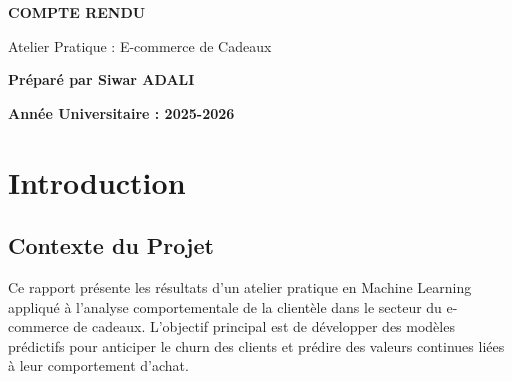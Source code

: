 \documentclass[11pt,a4paper]{article}
\begin{document}
\begin{titlepage}

\vspace{6cm}

\begin{center}
{\LARGE\textbf{COMPTE RENDU}}\par
\vspace{1cm}
{\large Atelier Pratique : E-commerce de Cadeaux}\par
\vspace{2cm}
{\large \textbf{Préparé par Siwar ADALI}}
\vspace{3cm}


\vspace{2cm}



\vspace{5cm}

{\textbf{Année Universitaire : 2025-2026}}

\end{center}
\vfill
\end{titlepage}

\section{Introduction}

\subsection{Contexte du Projet}
Ce rapport présente les résultats d'un atelier pratique en Machine Learning appliqué à l'analyse comportementale de la clientèle dans le secteur du e-commerce de cadeaux. L'objectif principal est de développer des modèles prédictifs pour anticiper le churn des clients et prédire des valeurs continues liées à leur comportement d'achat.
\end{document}
